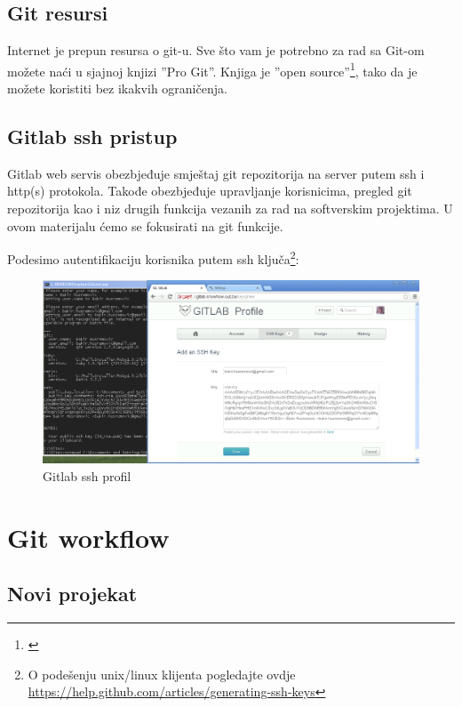 \documentclass[times, utf8, seminar]{fit}
\begin{document}
\subsection{Git resursi}

Internet je prepun resursa o git-u. Sve što vam je potrebno za rad sa Git-om možete naći u sjajnoj knjizi ''Pro Git''\citep{progit}. Knjiga je ''open source''\footnote{\href{https://github.s3.amazonaws.com/media/progit.en.pdf}{\color{blue}{PDF download}}}, tako da je možete koristiti bez ikakvih ograničenja.

\subsection{Gitlab ssh pristup}

Gitlab web servis obezbjeđuje smještaj git repozitorija na server putem ssh i http(s) protokola.
Takođe obezbjeđuje upravljanje korisnicima, pregled git repozitorija kao i niz drugih funkcija vezanih za rad na softverskim projektima.
U ovom materijalu ćemo se fokusirati na git funkcije.

Podesimo autentifikaciju korisnika putem ssh ključa\footnote{O podešenju unix/linux klijenta pogledajte ovdje \url{https://help.github.com/articles/generating-ssh-keys}}:

\begin{figure}[H]
\centering
\includegraphics[width=15cm]{img/gitlab_ssh_profile.png}
\caption{Gitlab ssh profil}
\end{figure}

\section{Git workflow}

\subsection{Novi projekat}
\end{document}
